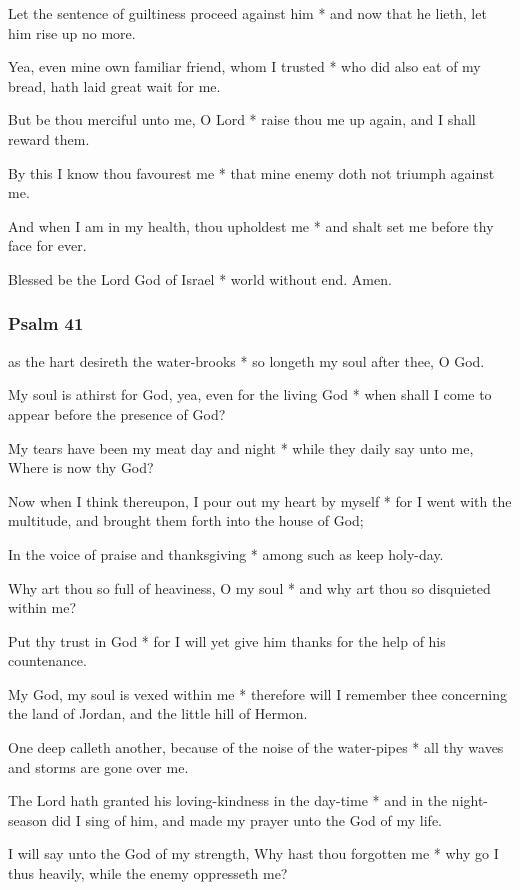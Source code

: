 Let the sentence of guiltiness proceed against him * and now that he lieth, let him rise up no more.

Yea, even mine own familiar friend, whom I trusted * who did also eat of my bread, hath laid great wait for me.

But be thou merciful unto me, O Lord * raise thou me up again, and I shall reward them.

By this I know thou favourest me * that mine enemy doth not triumph against me.

And when I am in my health, thou upholdest me * and shalt set me before thy face for ever.

Blessed be the Lord God of Israel * world without end. Amen.

\subsubsection{Psalm 41}


 as the hart desireth the water-brooks * so longeth my soul after thee, O God.

My soul is athirst for God, yea, even for the living God * when shall I come to appear before the presence of God?

My tears have been my meat day and night * while they daily say unto me, Where is now thy God?

Now when I think thereupon, I pour out my heart by myself * for I went with the multitude, and brought them forth into the house of God;

In the voice of praise and thanksgiving * among such as keep holy-day.

Why art thou so full of heaviness, O my soul * and why art thou so disquieted within me?

Put thy trust in God * for I will yet give him thanks for the help of his countenance.

My God, my soul is vexed within me * therefore will I remember thee concerning the land of Jordan, and the little hill of Hermon.

One deep calleth another, because of the noise of the water-pipes * all thy waves and storms are gone over me.

The Lord hath granted his loving-kindness in the day-time * and in the night-season did I sing of him, and made my prayer unto the God of my life.

I will say unto the God of my strength, Why hast thou forgotten me * why go I thus heavily, while the enemy oppresseth me?

